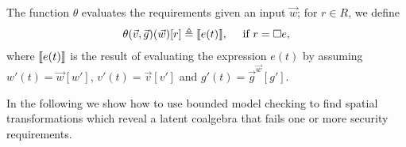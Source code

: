 The function $\theta$ evaluates the requirements given an input $\vec{w}$; for $r \in {R}$, we define
\begin{align}
	\theta(\vec{v},\vec{g})(\vec{w})[r]\triangleq {{\llbracket e(t)\rrbracket}}, \quad \text{ if $r={{\square}}{e}$}, 
\end{align}
where ${{\llbracket e(t)\rrbracket}}$ is the result of evaluating the expression $e(t)$ by assuming $w'(t)=\vec{w}[w']$, $v'(t)=\vec{v}[v']$ and $g'(t)=\vec{g}^{\vec{w}}[g']$.

In the following we show how to use bounded model checking to find spatial transformations which reveal a latent coalgebra that fails one or more security requirements. %

% 




